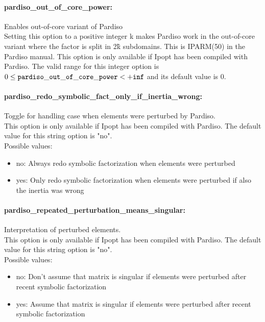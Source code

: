 \paragraph{pardiso\_out\_of\_core\_power:}\label{sec:pardiso_out_of_core_power} Enables out-of-core variant of Pardiso $\;$ \\
 Setting this option to a positive integer k makes
Pardiso work in the out-of-core variant where the
factor is split in 2\^k subdomains.  This is
IPARM(50) in the Pardiso manual.  This option is
only available if Ipopt has been compiled with
Pardiso. The valid range for this integer option is
$0 \le {\tt pardiso\_out\_of\_core\_power } <  {\tt +inf}$
and its default value is $0$.


\paragraph{pardiso\_redo\_symbolic\_fact\_only\_if\_inertia\_wrong:}\label{sec:pardiso_redo_symbolic_fact_only_if_inertia_wrong} Toggle for handling case when elements were perturbed by Pardiso. $\;$ \\
 This option is only available if Ipopt has been
compiled with Pardiso.
The default value for this string option is "no".
\\ 
Possible values:
\begin{itemize}
   \item no: Always redo symbolic factorization when
elements were perturbed
   \item yes: Only redo symbolic factorization when elements
were perturbed if also the inertia was wrong
\end{itemize}

\paragraph{pardiso\_repeated\_perturbation\_means\_singular:}\label{sec:pardiso_repeated_perturbation_means_singular} Interpretation of perturbed elements. $\;$ \\
 This option is only available if Ipopt has been
compiled with Pardiso.
The default value for this string option is "no".
\\ 
Possible values:
\begin{itemize}
   \item no: Don't assume that matrix is singular if
elements were perturbed after recent symbolic
factorization
   \item yes: Assume that matrix is singular if elements were
perturbed after recent symbolic factorization
\end{itemize}

